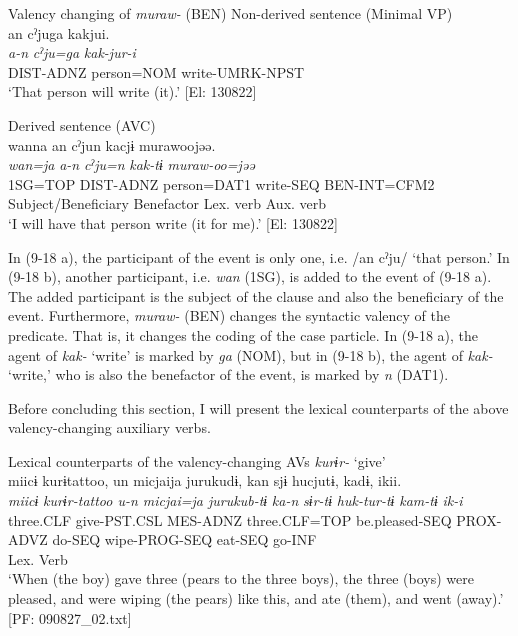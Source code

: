 \ea   Valency changing of \textit{muraw-} (BEN) \label{ex:9.18}
  \ea Non-derived sentence (Minimal VP)\label{ex:9.18a}\\
\glll     an  cˀjuga  kakjui.\\
      \textit{a-n}  \textit{cˀju=ga}  \textit{kak-jur-i}\\
      DIST-ADNZ  person=NOM  write-UMRK-NPST\\
      \glt       ‘That person will write (it).’ [El: 130822]

  \ex  Derived sentence (AVC)\label{ex:9.18b}\\
      \gllll wanna  an  cˀjun  kacjɨ   murawoojəə.\\
      \textit{wan=ja}  \textit{a-n}  \textit{cˀju=n}  \textit{kak-tɨ}      \textit{muraw{}-oo=jəə}\\
      1SG=TOP  DIST-ADNZ  person=DAT1  write-SEQ   BEN-INT=CFM2\\
      Subject/Beneficiary Benefactor  Lex. verb  Aux. verb \\      
      \glt ‘I will have that person write (it for me).’       [El: 130822]
    \z
\z

In (9-18 a), the participant of the event is only one, i.e. /an cˀju/ ‘that person.’ In (9-18 b), another participant, i.e. \textit{wan} (1SG), is added to the event of (9-18 a). The added participant is the subject of the clause and also the beneficiary of the event. Furthermore, \textit{muraw-} (BEN) changes the syntactic valency of the predicate. That is, it changes the coding of the case particle. In (9-18 a), the agent of \textit{kak-} ‘write’ is marked by \textit{ga} (NOM), but in (9-18 b), the agent of \textit{kak-} ‘write,’ who is also the benefactor of the event, is marked by \textit{n} (DAT1).

  Before concluding this section, I will present the lexical counterparts of the above valency-changing auxiliary verbs.

\ea   Lexical counterparts of the valency-changing AVs \label{ex:9.19}
\ea \textit{kurɨr-} ‘give’\\
   \gllll miicɨ  kurɨtattoo,  un  micjaija  jurukudɨ, kan  sjɨ  hucjutɨ,  kadɨ,  ikii.\\
    \textit{miicɨ}  \textit{kurɨr{}-tattoo  u-n  micjai=ja  jurukub-tɨ}  \textit{ka-n}  \textit{sɨr-tɨ}  \textit{huk-tur-tɨ}  \textit{kam-tɨ}  \textit{ik-i}\\
    three.CLF  give-PST.CSL  MES-ADNZ  three.CLF=TOP  be.pleased-SEQ  PROX-ADVZ  do-SEQ  wipe-PROG-SEQ  eat-SEQ  go-INF\\
      Lex. Verb    \\
    \glt  ‘When (the boy) gave three (pears to the three boys), the three (boys) were pleased, and were wiping (the pears) like this, and ate (them), and went (away).’   [PF: 090827\_02.txt]

